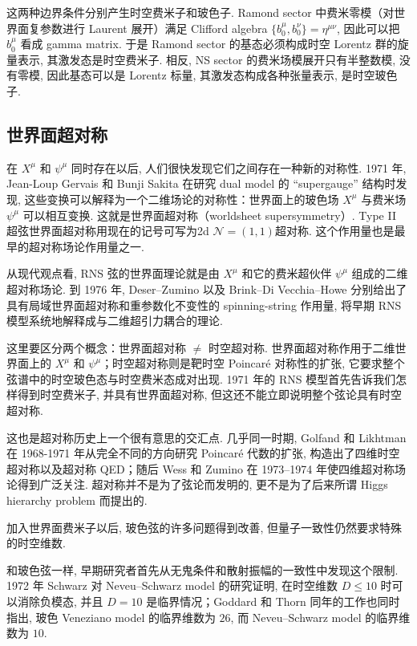 \documentclass[10pt]{article}
\numberwithin{equation}{section}
\begin{document}
这两种边界条件分别产生时空费米子和玻色子. Ramond sector 中费米零模（对世界面复参数进行 Laurent 展开）满足 Clifford algebra $\{b_0^\mu, b_0^\nu\}=\eta^{\mu\nu}$, 因此可以把 $b_0^\mu$ 看成 gamma matrix. 于是 Ramond sector 的基态必须构成时空 Lorentz 群的旋量表示, 其激发态是时空费米子. 相反, NS sector 的费米场模展开只有半整数模, 没有零模, 因此基态可以是 Lorentz 标量, 其激发态构成各种张量表示, 是时空玻色子. 

\subsection{世界面超对称}

在 $X^\mu$ 和 $\psi^\mu$ 同时存在以后, 人们很快发现它们之间存在一种新的对称性. 1971 年, Jean-Loup Gervais 和 Bunji Sakita 在研究 dual model 的 “supergauge” 结构时发现, 这些变换可以解释为一个二维场论的对称性：世界面上的玻色场 $X^\mu$ 与费米场 $\psi^\mu$ 可以相互变换. 这就是世界面超对称（worldsheet supersymmetry）. Type II 超弦世界面超对称用现在的记号可写为2d $\mathcal{N}=(1,1)$超对称. 这个作用量也是最早的超对称场论作用量之一\cite{GervaisSakita1971}. 

从现代观点看, RNS 弦的世界面理论就是由 $X^\mu$ 和它的费米超伙伴 $\psi^\mu$ 组成的二维超对称场论. 到 1976 年, Deser–Zumino 以及 Brink–Di Vecchia–Howe 分别给出了具有局域世界面超对称和重参数化不变性的 spinning-string 作用量, 将早期 RNS 模型系统地解释成与二维超引力耦合的理论\cite{BrinkDiVecchiaHowe1976,DeserZumino1976}. 

这里要区分两个概念：世界面超对称 $\neq$ 时空超对称. 世界面超对称作用于二维世界面上的 $X^\mu$ 和 $\psi^\mu$；时空超对称则是靶时空 Poincaré 对称性的扩张, 它要求整个弦谱中的时空玻色态与时空费米态成对出现. 1971 年的 RNS 模型首先告诉我们怎样得到时空费米子, 并具有世界面超对称, 但这还不能立即说明整个弦论具有时空超对称. 

这也是超对称历史上一个很有意思的交汇点. 几乎同一时期, Golfand 和 Likhtman 在 1968-1971 年从完全不同的方向研究 Poincaré 代数的扩张, 构造出了四维时空超对称以及超对称 QED；随后 Wess 和 Zumino 在 1973–1974 年使四维超对称场论得到广泛关注\cite{GolfandLikhtman1971,WessZumino1974}. 超对称并不是为了弦论而发明的, 更不是为了后来所谓 Higgs hierarchy problem 而提出的. 

加入世界面费米子以后, 玻色弦的许多问题得到改善, 但量子一致性仍然要求特殊的时空维数. 

和玻色弦一样, 早期研究者首先从无鬼条件和散射振幅的一致性中发现这个限制. 1972 年 Schwarz 对 Neveu–Schwarz model 的研究证明, 在时空维数 $D\leq10$ 时可以消除负模态, 并且 $D=10$ 是临界情况；Goddard 和 Thorn 同年的工作也同时指出, 玻色 Veneziano model 的临界维数为 $26$, 而 Neveu–Schwarz model 的临界维数为 $10$\cite{Schwarz1972,GoddardThorn1972}. 
\end{document}

